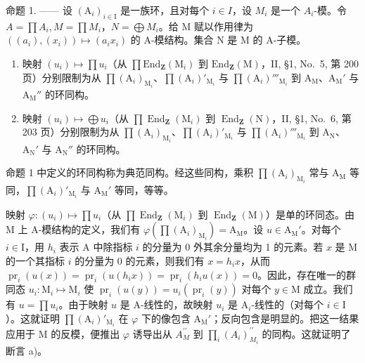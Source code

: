 命题 1. —— 设 \((\mathrm{A}_{i})_{i\in\mathrm{I}}\) 是一族环，且对每个 \(i\in I\)，设 \(M_{i}\) 是一个 \(A_{i}\)-模。令 \(A=\prod A_{i}, M=\prod M_{i}\)，\(N=\bigoplus M_{i}\)。给 M 赋以作用律为 \(((a_{i}),(x_{i}))\mapsto(a_{i}x_{i})\) 的 A-模结构。集合 N 是 M 的 A-子模。

\begin{enumerate}
\def\labelenumi{\alph{enumi})}
\item
  映射 \((u_i) \mapsto \prod u_i\)（从 \(\prod \mathrm{End}_{\mathbf{Z}}(\mathrm{M}_i)\) 到 \(\mathrm{End}_{\mathbf{Z}}(\mathrm{M})\)，II, §1, No.~5, 第 200 页）分别限制为从 \(\prod (\mathrm{A}_i)_{\mathrm{M}_i}\)、\(\prod (\mathrm{A}_i)'_{\mathrm{M}_i}\) 与 \(\prod (\mathrm{A}_i)'''_{\mathrm{M}_i}\) 到 \(\mathrm{A}_{\mathrm{M}}\)、\(\mathrm{A}_{\mathrm{M}}'\) 与 \(\mathrm{A}_{\mathrm{M}}''\) 的环同构。
\item
  映射 \((u_i) \mapsto \bigoplus u_i\)（从 \(\prod \operatorname{End}_{\mathbf{Z}}(\mathrm{M}_i)\) 到 \(\operatorname{End}_{\mathbf{Z}}(\mathrm{N})\)，II, §1, No.~6, 第 203 页）分别限制为从 \(\prod (\mathrm{A}_i)_{\mathrm{M}_i}\)、\(\prod (\mathrm{A}_i)'_{\mathrm{M}_i}\) 与 \(\prod (\mathrm{A}_i)'''_{\mathrm{M}_i}\) 到 \(\mathrm{A_N}\)、\(\mathrm{A_N}'\) 与 \(\mathrm{A_N}''\) 的环同构。
\end{enumerate}

命题 1 中定义的环同构称为典范同构。经这些同构，乘积 \(\prod (\mathrm{A}_i)_{\mathrm{M}_i}\) 常与 \(\mathrm{A_M}\) 等同，\(\prod (\mathrm{A}_i)'_{\mathrm{M}_i}\) 与 \(\mathrm{A_M}'\) 等同，等等。

映射 \(\varphi : (u_i) \mapsto \prod u_i\)（从 \(\prod \operatorname{End}_{\mathbf{Z}}(\mathrm{M}_i)\) 到 \(\operatorname{End}_{\mathbf{Z}}(\mathrm{M})\)）是单的环同态。由 M 上 A-模结构的定义，我们有 \(\varphi(\prod (\mathrm{A}_i)_{\mathrm{M}_i}) = \mathrm{A}_{\mathrm{M}}\)。设 \(u \in \mathrm{A}_{\mathrm{M}}'\)。对每个 \(i \in \mathrm{I}\)，用 \(h_i\) 表示 A 中除指标 \(i\) 的分量为 0 外其余分量均为 1 的元素。若 \(x\) 是 M 的一个其指标 \(i\) 的分量为 0 的元素，则我们有 \(x = h_i x\)，从而 \(\operatorname{pr}_i(u(x)) = \operatorname{pr}_i(u(h_i x)) = \operatorname{pr}_i(h_i u(x)) = 0\)。因此，存在唯一的群同态 \(u_i: \mathrm{M}_i \mapsto \mathrm{M}_i\) 使 \(\operatorname{pr}_i(u(y)) = u_i(\operatorname{pr}_i(y))\) 对每个 \(y \in \mathrm{M}\) 成立。我们有 \(u = \prod u_i\)。由于映射 \(u\) 是 A-线性的，故映射 \(u_i\) 是 \(\mathrm{A}_i\)-线性的（对每个 \(i \in \mathrm{I}\)）。这就证明 \(\prod (\mathrm{A}_i)'_{\mathrm{M}_i}\) 在 \(\varphi\) 下的像包含 \(\mathrm{A}_{\mathrm{M}}'\)；反向包含是明显的。把这一结果应用于 M 的反模，便推出 \(\varphi\) 诱导出从 \(A_{M}^{\prime \prime}\) 到 \(\prod_i(A_i)_{M_i}^{\prime \prime}\) 的同构。这就证明了断言 a)。


